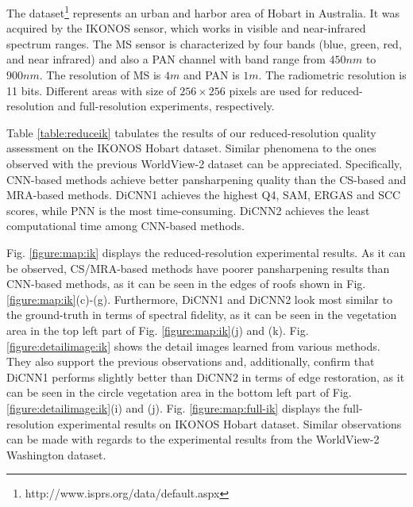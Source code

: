 \documentclass[journal]{IEEEtran}
\begin{document}
The dataset\footnote{http://www.isprs.org/data/default.aspx} represents an urban and harbor area of Hobart in Australia. It was acquired by the IKONOS sensor, which works in visible and near-infrared spectrum ranges. The MS sensor is characterized by four bands (blue, green, red, and near infrared) and also a PAN channel with band range from $450nm$ to $900nm$. The resolution of MS is $4m$ and PAN is $1m$. The radiometric resolution is 11 bits. Different areas with size of $256\times256$ pixels are used for reduced-resolution and full-resolution experiments, respectively.

Table \ref{table:reduceik} tabulates the results of our reduced-resolution quality assessment on the IKONOS Hobart dataset. Similar phenomena to the ones observed with the previous WorldView-2 dataset can be appreciated. Specifically, CNN-based methods achieve better pansharpening quality than the CS-based and MRA-based methods. DiCNN1 achieves the highest Q4, SAM, ERGAS and SCC scores, while PNN is the most time-consuming. DiCNN2 achieves the least computational time among CNN-based methods.

Fig. \ref{figure:map:ik} displays the reduced-resolution experimental results. As it can be observed, CS/MRA-based methods have poorer pansharpening results than CNN-based methods, as it can be seen in the edges of roofs shown in Fig. \ref{figure:map:ik}(c)-(g). Furthermore, DiCNN1 and DiCNN2 look most similar to the ground-truth in terms of spectral fidelity, as it can be seen in the vegetation area in the top left part of Fig. \ref{figure:map:ik}(j) and (k). Fig. \ref{figure:detailimage:ik} shows the detail images learned from various methods. They also support the previous observations and, additionally, confirm that DiCNN1 performs slightly better than DiCNN2 in terms of edge restoration, as it can be seen in the circle vegetation area in the bottom left part of Fig. \ref{figure:detailimage:ik}(i) and (j). Fig. \ref{figure:map:full-ik} displays the full-resolution experimental results on IKONOS Hobart dataset. Similar observations can be made with regards to the experimental results from the WorldView-2 Washington dataset.
\end{document}
